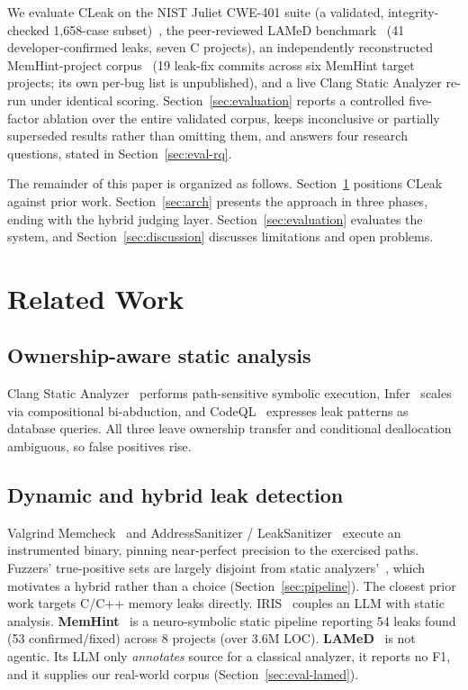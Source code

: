 \documentclass[a4paper]{llncs}
\begin{document}
We evaluate CLeak on the NIST Juliet CWE-401 suite (a validated,
integrity-checked 1{,}658-case subset)~\cite{juliet}, the peer-reviewed LAMeD
benchmark~\cite{lamed,lamed-benchmark} (41 developer-confirmed leaks, seven C projects),
an independently reconstructed MemHint-project corpus~\cite{memhint} (19
leak-fix commits across six MemHint target projects; its own per-bug
list is unpublished), and a live Clang Static Analyzer re-run under
identical scoring. Section~\ref{sec:evaluation} reports a controlled
five-factor ablation over the entire validated corpus, keeps
inconclusive or partially superseded results rather than omitting them,
and answers four research questions, stated in
Section~\ref{sec:eval-rq}.

The remainder of this paper is organized as follows.
Section~\ref{sec:related} positions CLeak against prior work.
Section~\ref{sec:arch} presents the approach in three phases, ending
with the hybrid judging layer.
Section~\ref{sec:evaluation} evaluates the system, and Section~\ref{sec:discussion}
discusses limitations and open problems.

\section{Related Work}
\label{sec:related}

\subsection{Ownership-aware static analysis}
Clang Static Analyzer~\cite{clangsa} performs path-sensitive symbolic
execution, Infer~\cite{infer} scales via compositional bi-abduction,
and CodeQL~\cite{codeql} expresses leak patterns as database queries.
All three leave ownership transfer and conditional deallocation
ambiguous, so false positives rise.

\subsection{Dynamic and hybrid leak detection}
Valgrind Memcheck~\cite{valgrind} and
AddressSanitizer / LeakSanitizer~\cite{asan} execute an instrumented
binary, pinning near-perfect precision to the exercised paths.
Fuzzers' true-positive sets are
largely disjoint from static analyzers'~\cite{fuzzer-vs-sa}, which
motivates a hybrid rather than a choice
(Section~\ref{sec:pipeline}). The closest prior work targets C/C++
memory leaks directly. IRIS~\cite{iris} couples an LLM with static
analysis. \textbf{MemHint}~\cite{memhint} is a neuro-symbolic static
pipeline reporting 54 leaks found (53 confirmed/fixed) across 8
projects (over 3.6M LOC). \textbf{LAMeD}~\cite{lamed,lamed-benchmark}
is not agentic. Its LLM only \emph{annotates} source for a classical
analyzer, it reports no F1, and it supplies our real-world corpus
(Section~\ref{sec:eval-lamed}).
\end{document}
